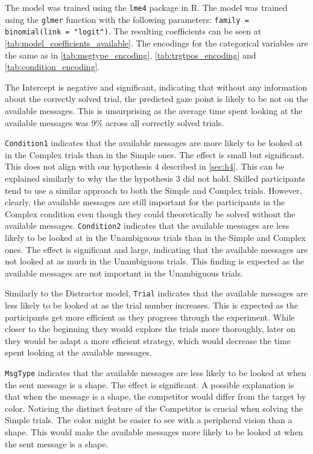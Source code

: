 The model was trained using the \texttt{lme4} package in R. The model was trained using the \texttt{glmer} function with the following parameters: \texttt{family = binomial(link = "logit")}. The resulting coefficients can be seen at \autoref{tab:model_coefficients_available}. The encodings for the categorical variables are the same as in \autoref{tab:msgtype_encoding}, \autoref{tab:trgtpos_encoding} and \autoref{tab:condition_encoding}.

The Intercept is negative and significant, indicating that without any information about the correctly solved trial, the predicted gaze point is likely to be not on the available messages. This is unsurprising as the average time spent looking at the available messages was 9\% across all correctly solved trials. 

\texttt{Condition1} indicates that the available messages are more likely to be looked at in the Complex trials than in the Simple ones. The effect is small but significant. This does not align with our hypothesis 4 described in \autoref{sec:h4}. This can be explained similarly to why the the hypothesis 3 did not hold. Skilled participants tend to use a similar approach to both the Simple and Complex trials. However, clearly, the available messages are still important for the participants in the Complex condition even though they could theoretically be solved without the available messages. \texttt{Condition2} indicates that the available messages are less likely to be looked at in the Unambiguous trials than in the Simple and Complex ones. The effect is significant and large, indicating that the available messages are not looked at as much in the Unambiguous trials. This finding is expected as the available messages are not important in the Unambiguous trials.

Similarly to the Distractor model, \texttt{Trial} indicates that the available messages are less likely to be looked at as the trial number increases. This is expected as the participants get more efficient as they progress through the experiment. While closer to the beginning they would explore the trials more thoroughly, later on they would be adapt a more efficient strategy, which would decrease the time spent looking at the available messages.

\texttt{MsgType} indicates that the available messages are less likely to be looked at when the sent message is a shape. The effect is significant. A possible explanation is that when the message is a shape, the competitor would differ from the target by color. Noticing the distinct feature of the Competitor is crucial when solving the Simple trials. The color might be easier to see with a peripheral vision than a shape. This would make the available messages more likely to be looked at when the sent message is a shape.

